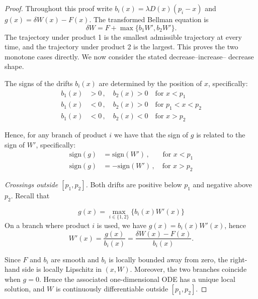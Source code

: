 \documentclass[11pt]{article}
\begin{document}
\begin{proof}
Throughout this proof write $b_i(x)=\lambda D(x)(p_i-x)$ and
$g(x)=\delta W(x)-F(x)$. The transformed Bellman equation is
\begin{equation*}
\delta W=F+\max\{b_1W',b_2W'\}.
\end{equation*}
The trajectory under product 1 is the smallest admissible trajectory at
every time, and the trajectory under product 2 is the largest. This proves
the two monotone cases directly. We now consider the stated decrease--increase--
decrease shape.

The signs of the drifts $b_i(x)$ are determined by the position of $x$, specifically:
\begin{align}
       b_1(x) &>0 \,,\quad b_2(x)>0 \quad \text{for } x<p_1 \\
       b_1(x) &<0 \,,\quad b_2(x)>0 \quad \text{for } p_1< x <p_2 \\
       b_1(x) &<0 \,,\quad b_2(x)<0 \quad \text{for } x > p_2  
\end{align} 

Hence, for any branch of product $i$ we have that the sign of $g$ is related to the sign of $W'$, specifically:
\begin{align}
       \text{sign}(g) &= \text{sign}(W') \,,\,\,\,\,\,\quad \text{for } x<p_1 \\
       \text{sign}(g) &= -\text{sign}(W') \,,\quad \text{for } x>p_2
\end{align} 

\medskip\noindent\textit{Crossings outside $[p_1,p_2]$.}
Both drifts are positive below $p_1$ and negative above $p_2$. Recall that 

\begin{equation*}
       g(x) = \max_{i\in\{1,2\}}\{b_i(x)W'(x)\}
\end{equation*}
 On a branch where product $i$ is used, we have $g(x)=b_i(x)W'(x)$, hence 
\begin{equation*}
       W'(x)=\frac{g(x)}{b_i(x)}=\frac{\delta W(x)-F(x)}{b_i(x)}.
\end{equation*}

Since $F$ and $b_i$ are smooth and $b_i$ is locally bounded away from zero,
the right-hand side is locally Lipschitz in $(x,W)$. Moreover, the two
branches coincide when $g=0$. Hence the associated one-dimensional ODE has
a unique local solution, and $W$ is continuously differentiable outside $[p_1,p_2]$. 


\end{proof}
\end{document}
